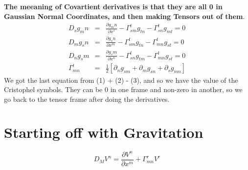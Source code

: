 \textbf{The meeaning of Covartient derivatives is that they are all 0 in Gaussian Normal Coordinates, and then making Tensors out of them}.
\begin{eqnarray}
  D_s g_mn &=& \frac{\partial g_mn}{\partial x^s} - \Gamma^{t}_{sm} g_{tn} - \Gamma^{t}_{sn} g_{mt} = 0 \\
  D_m g_sn &=& \frac{\partial g_sn}{\partial x^m} - \Gamma^{t}_{sm} g_{tn} - \Gamma^{t}_{mn} g_{st} = 0 \\
  D_n g_sm &=& \frac{\partial g_sm}{\partial x^n} - \Gamma^{t}_{sn} g_{tm} - \Gamma^{t}_{mn} g_{st} = 0 \\
  \Gamma^{t}_{mn} &=& \frac{1}{2} [\partial_n g_{sm} + \partial_m g_{sn} + \partial_s g_{mn}]
\end{eqnarray}
We got the last equation from (1) + (2) - (3), and so we have the value of the Cristophel symbols. They can be 0 in one frame and non-zero in another, so we go back to the tensor frame after doing the derivatives.



\section{Starting off with Gravitation}

\begin{equation}
  D_M V^n = \frac{\partial V^n}{\partial x^m} + \Gamma_{mn}^{r} V^r
\end{equation}